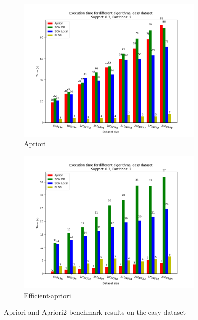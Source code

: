 \documentclass[a4paper]{article}
\begin{document}
	\begin{figure}[h]
		\centering
		\begin{subfigure}[b]{0.49\textwidth}
			\centering
			\includegraphics[width=\textwidth]{easy_aprioribenchmark.png}
         	\caption{Apriori}
		\end{subfigure}
		\hfill		
		\begin{subfigure}[b]{0.49\textwidth}
			\centering
			\includegraphics[width=\textwidth]{easy_apriori2benchmark.png}
         	\caption{Efficient-apriori}
		\end{subfigure}
		\hfill
		\caption{Apriori and Apriori2 benchmark results on the easy dataset}
		\label{fig:aprioribenchmark-e}
	\end{figure}
\end{document}
